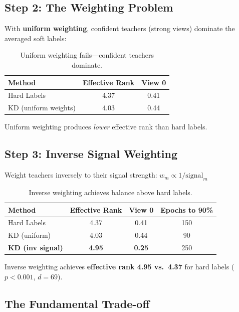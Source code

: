 \documentclass{article}
\begin{document}
\subsection{Step 2: The Weighting Problem}

With \textbf{uniform weighting}, confident teachers (strong views) dominate the averaged soft labels:

\begin{table}[h]
\centering
\caption{Uniform weighting fails---confident teachers dominate.}
\label{tab:uniform}
\begin{tabular}{@{}lcc@{}}
\toprule
Method & Effective Rank & View 0 \\
\midrule
Hard Labels & 4.37 & 0.41 \\
KD (uniform weights) & 4.03 & 0.44 \\
\bottomrule
\end{tabular}
\end{table}

Uniform weighting produces \textit{lower} effective rank than hard labels.

\subsection{Step 3: Inverse Signal Weighting}

Weight teachers inversely to their signal strength: $w_m \propto 1/\text{signal}_m$

\begin{table}[h]
\centering
\caption{Inverse weighting achieves balance above hard labels.}
\label{tab:inverse}
\begin{tabular}{@{}lccc@{}}
\toprule
Method & Effective Rank & View 0 & Epochs to 90\% \\
\midrule
Hard Labels & 4.37 & 0.41 & 150 \\
KD (uniform) & 4.03 & 0.44 & 90 \\
\textbf{KD (inv signal)} & \textbf{4.95} & \textbf{0.25} & 250 \\
\bottomrule
\end{tabular}
\end{table}

Inverse weighting achieves \textbf{effective rank 4.95 vs.\ 4.37} for hard labels ($p < 0.001$, $d = 69$).

\subsection{The Fundamental Trade-off}
\end{document}
